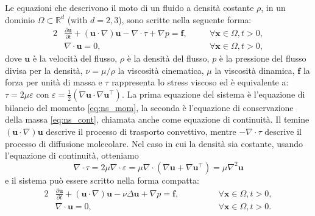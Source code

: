     Le equazioni che descrivono il moto di un fluido a densità costante $\rho$, in un dominio $\Omega  \subset  \mathbb{R}^d$ (with $d = 2, 3$),
    sono scritte nella seguente forma:
    \begin{alignat}{2}
        &\frac{\partial \boldsymbol{u}}{\partial t} +
        \left(\boldsymbol{u} \cdot \nabla \right) \boldsymbol{u} -
        \nabla \cdot \tau + \nabla p
        =
        \boldsymbol{f}, \,\,\,\,\,\, &&\forall \boldsymbol{x} \in \Omega, t > 0, \label{eq:ns_mom}\\
        &\nabla \cdot \boldsymbol{u} = 0, \,\,\,\,\,\, &&\forall \boldsymbol{x} \in \Omega, t > 0, \label{eq:ns_cont}
    \end{alignat}
    dove $\boldsymbol{u}$ è la velocità del flusso, $\rho$ è la densità del flusso, $p$ è la pressione del flusso divisa per la densità,
    $\nu = \mu / \rho$ la viscosità cinematica, $\mu$ la viscosità dinamica, $\boldsymbol{f}$ la forza per unità di massa e $\tau$ rappresenta lo stress viscoso ed è equivalente a:
    $\tau = 2\mu\varepsilon$ con $\varepsilon=\frac{1}{2}\left(\nabla\boldsymbol{u}\cdot\nabla\boldsymbol{u}^\top\right)$.
    La prima equazione del sistema è l'equazione di bilancio del momento \eqref{eq:ns_mom},
    la seconda è l'equazione di conservazione della massa \eqref{eq:ns_cont},
    chiamata anche come equazione di continuità. Il temine $\left(\boldsymbol{u} \cdot \nabla \right) \boldsymbol{u}$ descrive il processo di trasporto convettivo,
    mentre $-\nabla \cdot \tau$ descrive il processo di diffusione molecolare.
    Nel caso in cui la densità sia costante, usando l'equazione di continuità, otteniamo
    \begin{equation}
    \nabla \cdot \tau = 2\mu\nabla \cdot \varepsilon = \mu\nabla \cdot \left(\nabla\boldsymbol{u} + \nabla\boldsymbol{u}^\top \right) = \mu\nabla^2\boldsymbol{u}
    \end{equation}
    e il sistema può essere scritto nella forma compatta:
    \begin{alignat}{2}
        &\frac{\partial \boldsymbol{u}}{\partial t} +
        \left(\boldsymbol{u} \cdot \nabla \right) \boldsymbol{u} -
        \nu \Delta \boldsymbol{u} + \nabla p
        =
        \boldsymbol{f}, \,\,\,\,\,\, \qquad &&\forall \boldsymbol{x} \in \Omega, t > 0, \label{eq:ns_mom_2}\\
        &\nabla \cdot \boldsymbol{u} = 0, \,\,\,\,\,\, &&\forall \boldsymbol{x} \in \Omega, t > 0. \label{eq:ns_cont_2}
    \end{alignat}
